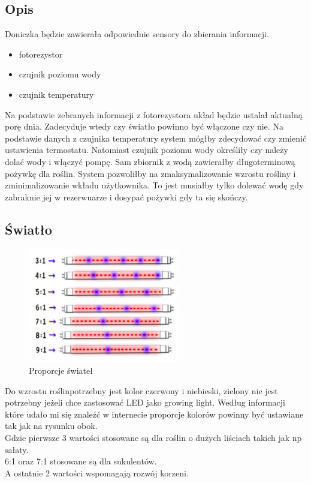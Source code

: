 \documentclass[a4paper,11pt]{uzreport}
\begin{document}
\subsection{Opis}
Doniczka będzie zawierała odpowiednie sensory do zbierania informacji.
\begin{itemize}
    \item fotorezystor
    \item czujnik poziomu wody
    \item czujnik temperatury
\end{itemize}
Na podstawie zebranych informacji z fotorezystora układ będzie ustalał aktualną porę dnia. Zadecyduje wtedy czy światło powinno być włączone czy nie. Na podstawie danych z czujnika temperatury system mógłby zdecydować czy zmienić ustawienia termostatu. Natomiast czujnik poziomu wody określiły czy należy dolać wody i włączyć pompę. Sam zbiornik z wodą zawierałby długoterminową pożywkę dla roślin. System pozwoliłby na zmaksymalizowanie wzrostu rośliny i zminimalizowanie wkładu użytkownika. To jest musiałby tylko dolewać wodę gdy zabraknie jej w rezerwuarze i dosypać pożywki gdy ta się skończy.
\clearpage
\subsection{Światło}
\begin{multicols}{2}
\begin{figure}[H]
    \centering
	     \includegraphics[width=.9\columnwidth,height=5cm]{listings/light.png}
    \caption{Proporcje świateł}
    \label{fig:my_label}
\end{figure}
	     \begin{text}
	         Do wzrostu roślinpotrzebny jest kolor czerwony i niebieski, zielony nie jest potrzebny jeżeli chce zastosować LED jako growing light.
                Według informacji które udało mi się znaleźć w internecie proporcje kolorów powinny być ustawiane tak jak na rysunku obok.\\
		         Gdzie pierwsze 3 wartości stosowane są dla roślin o dużych liściach takich jak np sałaty.\\
		         6:1 oraz 7:1 stosowane są dla sukulentów. \\
		         A ostatnie 2 wartości wspomagają rozwój korzeni.
	     \end{text}

\end{multicols}
\end{document}
